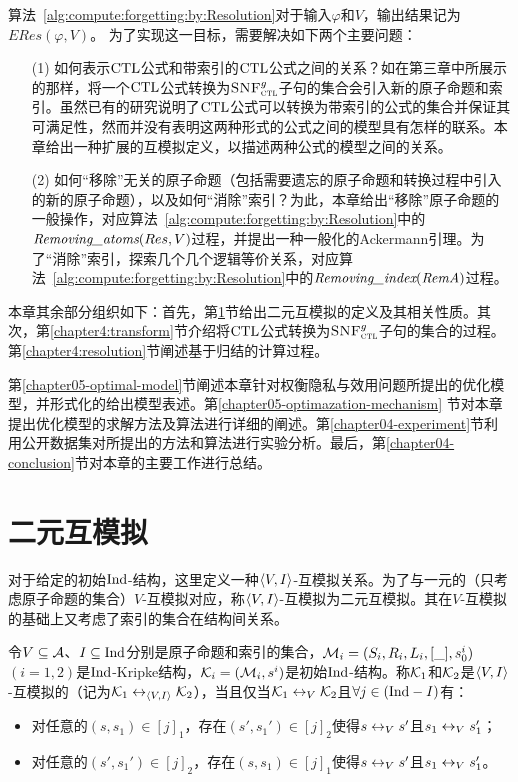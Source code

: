 算法~\ref{alg:compute:forgetting:by:Resolution}对于输入$\varphi$和$V$，输出结果记为$ERes(\varphi, V)$。
为了实现这一目标，需要解决如下两个主要问题：
\begin{itemize}
	\item[(1)] 如何表示$\textrm{CTL}$公式和带索引的$\textrm{CTL}$公式之间的关系？如在第三章中所展示的那样，将一个$\textrm{CTL}$公式转换为${\textsc{SNF}_{\textsc{ctl}}^g}$子句的集合会引入新的原子命题和索引。虽然已有的研究说明了$\textrm{CTL}$公式可以转换为带索引的公式的集合并保证其可满足性，然而并没有表明这两种形式的公式之间的模型具有怎样的联系。本章给出一种扩展的互模拟定义，以描述两种公式的模型之间的关系。
	\item[(2)] 如何“移除”无关的原子命题（包括需要遗忘的原子命题和转换过程中引入的新的原子命题），以及如何“消除”索引？为此，本章给出“移除”原子命题的一般操作，对应算法~\ref{alg:compute:forgetting:by:Resolution}中的$\emph{Removing\_atoms}(Res, V)$过程，并提出一种一般化的Ackermann引理。为了“消除”索引，探索几个几个逻辑等价关系，对应算法~\ref{alg:compute:forgetting:by:Resolution}中的$\emph{Removing\_index}(\emph{RemA})$过程。
\end{itemize}

本章其余部分组织如下：首先，第\ref{chapter4:sub:biVB}节给出二元互模拟的定义及其相关性质。其次，第\ref{chapter4:transform}节介绍将$\textrm{CTL}$公式转换为${\textsc{SNF}_{\textsc{ctl}}^g}$子句的集合的过程。第\ref{chapter4:resolution}节阐述基于归结的计算过程。

第\ref{chapter05-optimal-model}节阐述本章针对权衡隐私与效用问题所提出的优化模型，并形式化的给出模型表述。第\ref{chapter05-optimazation-mechanism} 节对本章提出优化模型的求解方法及算法进行详细的阐述。第\ref{chapter04-experiment}节利用公开数据集对所提出的方法和算法进行实验分析。最后，第\ref{chapter04-conclusion}节对本章的主要工作进行总结。

\section{二元互模拟}
\label{chapter4:sub:biVB}
对于给定的初始$\textrm{Ind}$-结构，这里定义一种${\langle{V, I}\rangle}$-互模拟关系。为了与一元的（只考虑原子命题的集合）$V$-互模拟对应，称${\langle{V, I}\rangle}$-互模拟为二元互模拟。其在$V$-互模拟的基础上又考虑了索引的集合在结构间关系。
\begin{definition}[二元互模拟] \label{def:VInd:bisimulation}
	令$V\subseteq {\cal A}$、$I\subseteq \textrm{Ind}$分别是原子命题和索引的集合，${\cal M}_i=(S_i, R_i, L_i, [\_],s_0^i)$ $(i=1,2)$是$\textrm{Ind}$-Kripke结构，${\cal K}_i=({\cal M}_i,s^i)$是初始$\textrm{Ind}$-结构。称${\cal K}_1$和${\cal K}_2$是${\langle{V, I}\rangle}$-互模拟的（记为${\cal K}_1 \leftrightarrow_{{\langle{V, I}\rangle}} {\cal K}_2$），当且仅当${\cal K}_1 \leftrightarrow_V {\cal K}_2$且$\forall j\in (\textrm{Ind} - I)$有：
	\begin{itemize}
		\item 对任意的$(s,s_1) \in [j]_1$，存在$(s',s_1')\in [j]_2$使得$s\leftrightarrow_V s'$且$s_1 \leftrightarrow_V s_1'$；
		\item 对任意的$(s',s_1') \in [j]_2$，存在$(s,s_1)\in [j]_1$使得$s\leftrightarrow_V s'$且$s_1 \leftrightarrow_V s_1'$。
	\end{itemize}
	
\end{definition}

